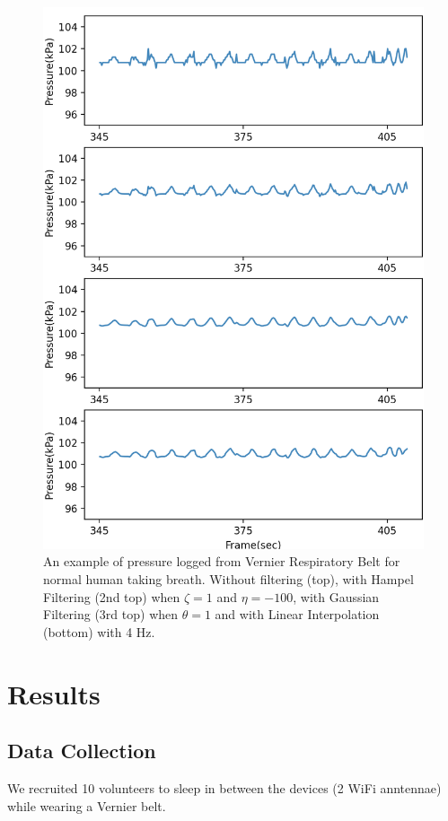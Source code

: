 \documentclass[10pt,letterpaper]{article}
\begin{document}
	
	\begin{figure}[htbp]
		\centerline{\includegraphics[width=120mm,scale=0.9]{FILGT_R2H2G2L.png}}
		\caption{An example of pressure logged from Vernier Respiratory Belt for normal human taking breath. Without filtering (top), with Hampel Filtering (2nd top) when  $\zeta=1$ and $\eta=-100$, with Gaussian Filtering (3rd top) when  $\theta=1$ and with Linear Interpolation (bottom) with 4 Hz.}
		\label{fig:FILGT_R2H2G2L}
	\end{figure}

	
	\section*{Results}
	
	\subsection*{Data Collection}
	
	We recruited 10 volunteers to sleep in between the devices (2 WiFi anntennae) while wearing a Vernier belt.
	
\end{document}
